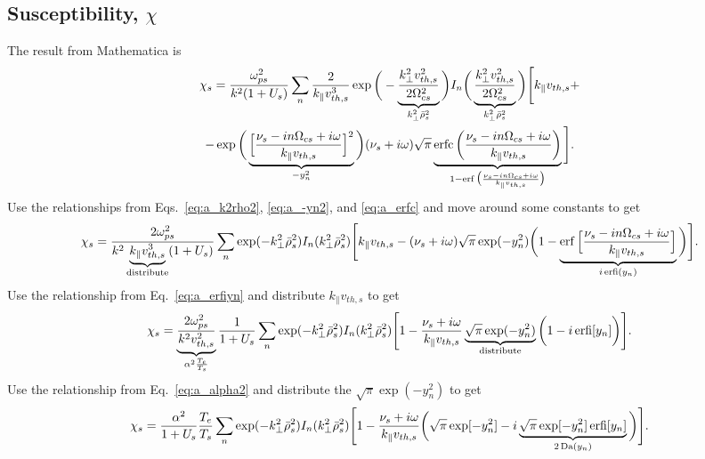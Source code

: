 \subsection{Susceptibility, $\chi$}
The result from Mathematica is
\begin{multline}
	\chi_s = \frac{\omega_{ps}^2}{k^2 (1+U_s)} \sum_n
	\frac{2}{k_\parallel v_{th,s}^3} 
	\exp\bigg( - \underbrace{\frac{k_\perp^2 v_{th,s}^2}{2 \Omega_{cs}^2}}_{k_\perp^2 \bar{\rho}_s^2}  \bigg)
	I_n\bigg( \underbrace{\frac{k_\perp^2 v_{th,s}^2}{2 \Omega_{cs}^2}}_{k_\perp^2 \bar{\rho}_s^2}  \bigg)
	\Bigg[ k_\parallel v_{th,s} +  \\
	- \exp \bigg( \underbrace{\Big[ \frac{\nu_s - i n \Omega_{cs} + i \omega}{k_\parallel v_{th,s}} \Big]^2}_{-y_n^2}  \bigg)
	(\nu_s + i \omega) \sqrt{\pi}
	\underbrace{\operatorname{erfc} \bigg( \frac{\nu_s - i n \Omega_{cs} + i\omega}{k_\parallel v_{th,s}} \bigg)}_{1-\operatorname{erf} \big( \frac{\nu_s - i n \Omega_{cs} + i\omega}{k_\parallel v_{th,s}} \big)}
	\Bigg].
\end{multline}
Use the relationships from Eqs.~\ref{eq:a_k2rho2}, \ref{eq:a_-yn2}, and \ref{eq:a_erfc} and move around some constants to get
\begin{equation}
	\chi_s = \frac{2 \omega_{ps}^2}{k^2 \underbrace{k_\parallel v_{th,s}^3}_{\text{distribute}} (1+U_s)} \sum_n
	\exp(-k_\perp^2 \bar{\rho}_s^2) 
	I_n(k_\perp^2 \bar{\rho}_s^2) 
	\Bigg[
	k_\parallel v_{th,s} - (\nu_s+i\omega) \sqrt{\pi} \exp(-y_n^2) 
	\bigg( 1 - \underbrace{\operatorname{erf} \Big[ \frac{\nu_s-in\Omega_{cs}+i\omega}{k_\parallel v_{th,s}} \Big]}_{i \operatorname{erfi}(y_n)}  \bigg)
	\Bigg].
\end{equation}
Use the relationship from Eq.~\ref{eq:a_erfiyn} and distribute $k_\parallel v_{th,s}$ to get
\begin{equation}
	\chi_s = \underbrace{\frac{2 \omega_{ps}^2}{k^2 v_{th,s}^2}}_{\alpha^2\frac{T_e}{T_s}} \frac{1}{1+U_s} \sum_n
	\exp(-k_\perp^2 \bar{\rho}_s^2) 
	I_n(k_\perp^2 \bar{\rho}_s^2) 
	\Bigg[ 1 - 
	\frac{\nu_s + i \omega}{k_\parallel v_{th,s}} 
	\underbrace{\sqrt{\pi} \exp(-y_n^2)}_{\text{distribute}}
	\bigg( 1 - i \operatorname{erfi} [y_n] \bigg)
	\Bigg].
\end{equation}
Use the relationship from Eq.~\ref{eq:a_alpha2} and distribute the $\sqrt{\pi}\exp(-y_n^2)$ to get
\begin{equation}
	\chi_s = \frac{\alpha^2}{1+U_s} \frac{T_e}{T_s} \sum_n
	\exp(-k_\perp^2 \bar{\rho}_s^2) 
	I_n(k_\perp^2 \bar{\rho}_s^2)
	\Bigg[
	1 - \frac{\nu_s + i\omega}{k_\parallel v_{th,s}}
	\bigg(\sqrt{\pi} \exp[-y_n^2] - i \underbrace{\sqrt{\pi} \exp[-y_n^2] \operatorname{erfi}[y_n]}_{2\operatorname{Da}(y_n)}  \bigg)
	\Bigg].
\end{equation}
